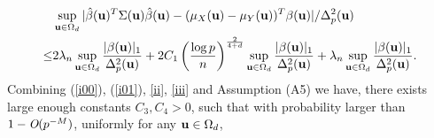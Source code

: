 \documentclass[11pt]{article}
\theoremstyle{definition}
\begin{document}
 \begin{align}\label{iii}
 	&\sup_{{\bf u}\in \Omega_d} |\hat{\beta}({\bf u})^T\Sigma({\bf u})\hat{\beta}({\bf u}) - (\mu_X({\bf u})-\mu_Y({\bf u}))^T\beta({\bf u}) |/\Delta^2_p({\bf u}) \\
 	\leq&
 	2\lambda_n\sup_{{\bf u}\in \Omega_d}\frac{|\beta({\bf u})|_1}{\Delta_p^2({\bf u})}+2 C_1\left(\frac{\log p}{n}\right)^{\frac{2}{4+d}}  \sup_{{\bf u}\in \Omega_d}\frac{|\beta({\bf u})|_1}{\Delta_p^2({\bf u})}+ \lambda_n\sup_{{\bf u}\in \Omega_d}\frac{|\beta({\bf u})|_1}{\Delta_p^2({\bf u})}.
 	\nonumber %
 \end{align}
 Combining (\ref{i00}), (\ref{i01}), \eqref{ii}, \eqref{iii} and Assumption (A5) we have, there exists large enough constants $C_3, C_4>0$, such that with probability larger than $1-\emph{O}(p^{-M})$, uniformly for any ${\bf u}\in \Omega_d$,
\end{document}
